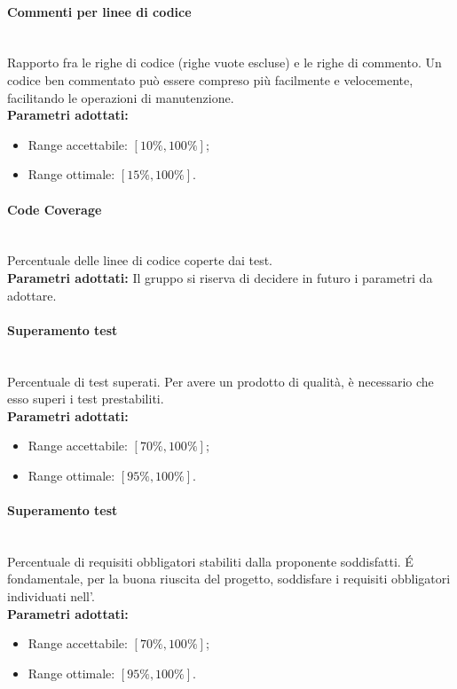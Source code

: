 \paragraph{Commenti per linee di codice}\mbox{}\\[0,3cm]
Rapporto fra le righe di codice (righe vuote escluse) e le righe di commento. Un codice ben commentato può essere compreso più facilmente e velocemente, facilitando le operazioni di manutenzione.\\[0,2cm]
\textbf{Parametri adottati:}
\begin{itemize}
	\item Range accettabile: $[10\%,100\%]$;
	\item Range ottimale: $[15\%,100\%]$.
\end{itemize}

\paragraph{Code Coverage}\mbox{}\\[0,3cm]
Percentuale delle linee di codice coperte dai test.\\[0,2cm]
\textbf{Parametri adottati:\newline}
Il gruppo \gruppo \space si riserva di decidere in futuro i parametri da adottare.

\paragraph{Superamento test}\mbox{}\\[0,3cm]
Percentuale di test superati. Per avere un prodotto di qualità, è necessario che esso superi i test prestabiliti.\\[0,2cm]
\textbf{Parametri adottati:}
\begin{itemize}
	\item Range accettabile: $[70\%,100\%]$;
	\item Range ottimale: $[95\%,100\%]$.
\end{itemize}

\paragraph{Superamento test}\mbox{}\\[0,3cm]
Percentuale di requisiti obbligatori stabiliti dalla proponente soddisfatti. \'E fondamentale, per la buona riuscita del progetto, soddisfare i requisiti obbligatori individuati nell'\AdR .\\[0,2cm]
\textbf{Parametri adottati:}
\begin{itemize}
	\item Range accettabile: $[70\%,100\%]$;
	\item Range ottimale: $[95\%,100\%]$.
\end{itemize}
	
